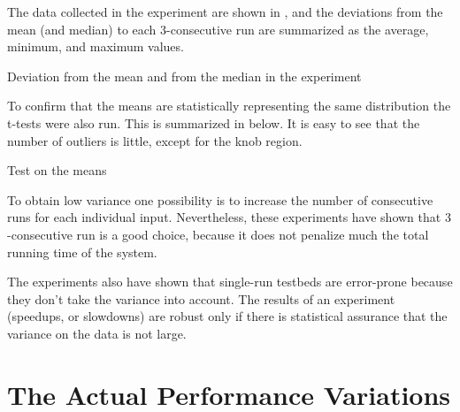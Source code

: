 The data collected in the experiment are shown in , and the deviations from the mean (and median) to each $3$-consecutive run are summarized as the average, minimum, and maximum values.

\begin{table}
  \centering
  \begin{tiny}
  
  \end{tiny}
  \caption{Deviation from the mean and from the median in the experiment}
  \label{tab:simStats}
\end{table}

To confirm that the means are statistically representing the same distribution the t-tests were also run. This is summarized in  below. It is easy to see that the number of outliers is little, except for the knob region. 

\begin{table}
  \centering
  \begin{tiny}
  
  \end{tiny}
  \caption{Test on the means}
  \label{tab:statTest}
\end{table}

To obtain low variance one possibility is to increase the number of consecutive runs for each individual input. Nevertheless, these experiments have shown that $3$-consecutive run is a good choice, because it does not penalize much the total running time of the system.

The experiments also have shown that single-run testbeds are error-prone because they don't take the variance into account. The results of an experiment (speedups, or slowdowns) are robust only if there is statistical assurance that the variance on the data is not large.


\section{The Actual Performance Variations}

